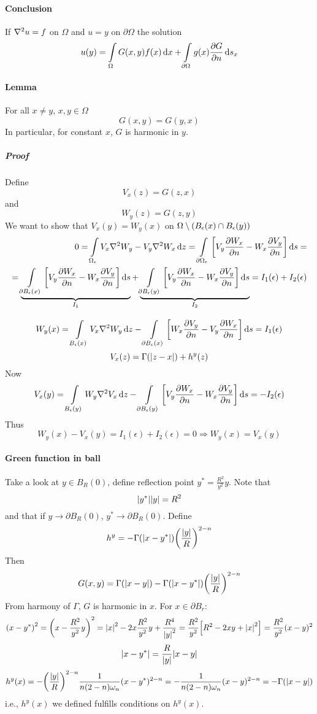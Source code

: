 \paragraph{Conclusion}
If $\laplacian{u} = f$ on $\Omega$ and $u=y$ on $\partial \Omega$
the solution
$$u(y) = \int\limits_{\Omega} G(x,y) f(x) \dd{x} + \int\limits_{\partial \Omega} g(x) \pdv{G}{n} \dd{s_x} $$
\paragraph{Lemma}
For all $x\neq y$, $x,y \in \Omega$
$$G(x,y) = G(y,x)$$
In particular, for constant $x$, $G$ is harmonic in $y$.
\subparagraph{Proof}
Define
$$V_x(z) = G(z,x)$$
and
$$W_y(z) = G(z,y)$$
We want to show that $V_x(y)= W_y(x)$ on $\Omega \setminus \qty(B_\epsilon(x) \cap B_\epsilon(y))$
\begin{align*}
0 = \int\limits_{\Omega_\epsilon} V_x\laplacian{W_y} -  V_y\laplacian{W_x} \dd{z} = \int\limits_{\partial \Omega_\epsilon} \qty[V_y \pdv{W_x}{n} - W_x \pdv{V_y}{n}] \dd{s} =\\= \underbrace{\int\limits_{\partial B_\epsilon(x) }\qty[V_y \pdv{W_x}{n} - W_x \pdv{V_y}{n}] \dd{s}}_{I_1} + \underbrace{\int\limits_{\partial B_\epsilon(y)} \qty[V_y \pdv{W_x}{n} - W_x \pdv{V_y}{n}] \dd{s}}_{I_2} = I_1(\epsilon) + I_2(\epsilon)
\end{align*}
$$$$
$$W_y(x) = \int\limits_{B_\epsilon(x)} V_x\laplacian{W_y} \dd{z} - \int\limits_{\partial B_\epsilon(x) }\qty[W_x \pdv{V_y}{n} - V_y \pdv{W_x}{n} ] \dd{s} = I_1(\epsilon)$$
$$V_x(z) = \Gamma(\abs{z-x}) + h^y(z)$$
Now
$$V_x(y) = \int\limits_{B_\epsilon(y)} W_y\laplacian{V_x} \dd{z} -  \int\limits_{\partial B_\epsilon(y)} \qty[V_y \pdv{W_x}{n} - W_x \pdv{V_y}{n}] \dd{s} = -I_2(\epsilon)$$
Thus
$$W_y(x) - V_x(y) = I_1(\epsilon) + I_2(\epsilon) = 0 \Rightarrow  W_y(x) = V_x(y)$$

\paragraph{Green function in ball}
Take a look at $y\in B_R(0)$, define reflection point $y^* = \frac{R^2}{y^2}y$. Note that
$$\abs{y^*}\abs{y} = R^2$$
and that if $y\to \partial B_R(0)$, $y^{*}\to \partial B_R(0)$.
Define
$$h^y = -\Gamma\qty(\abs{x-y^*}) \qty(\frac{\abs{y}}{R})^{2-n}$$
Then
$$G(x,y) =\Gamma(\abs{x-y}) -\Gamma\qty(\abs{x-y^*}) \qty(\frac{\abs{y}}{R})^{2-n}$$
From harmony of $\Gamma$, $G$ is harmonic in $x$. For $x \in \partial B_r$:
$$\qty(x-y^*)^2 = \qty(x - \frac{R^2}{y^2}y)^2 = \abs{x}^2 - 2x\frac{R^2}{y^2}y + \frac{R^4}{\abs{y}^2} = \frac{R^2}{y^2} \qty[R^2 - 2xy + \abs{x}^2] = \frac{R^2}{y^2} (x-y)^2$$
$$\abs{x-y^*} = \frac{R}{\abs{y}} \abs{x-y}  $$
$$h^y(x) = - \qty(\frac{\abs{y}}{R})^{2-n} \frac{1}{n(2-n)\omega_n}(x-y^*)^{2-n} = -\frac{1}{n(2-n)\omega_n} (x-y)^{2-n} = -\Gamma(\abs{x-y})$$
i.e., $h^y(x)$ we defined fulfills conditions on $h^y(x)$.

